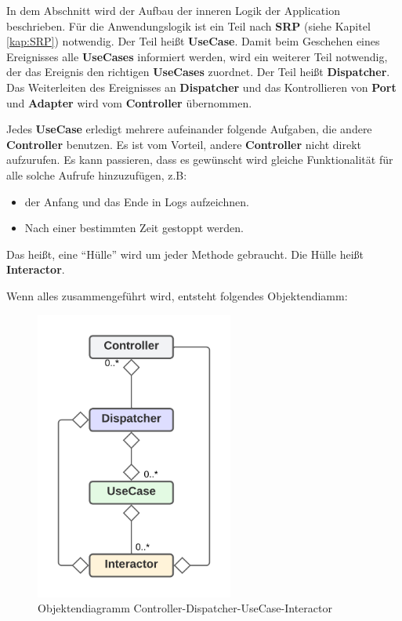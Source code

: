 In dem Abschnitt wird der Aufbau der inneren Logik der Application beschrieben. 
Für die Anwendungslogik ist ein Teil nach \textbf{SRP} (siehe Kapitel \ref{kap:SRP}) notwendig. 
Der Teil heißt \textbf{UseCase}.
Damit beim Geschehen eines Ereignisses alle \textbf{UseCases} informiert werden, 
wird ein weiterer Teil notwendig, der das Ereignis den richtigen \textbf{UseCases} zuordnet.  
Der Teil heißt \textbf{Dispatcher}.
Das Weiterleiten des Ereignisses an \textbf{Dispatcher} und das Kontrollieren von \textbf{Port} und \textbf{Adapter} wird 
vom \textbf{Controller} übernommen.

Jedes \textbf{UseCase} erledigt mehrere aufeinander folgende Aufgaben, die andere \textbf{Controller} benutzen.
Es ist vom Vorteil, andere \textbf{Controller} nicht direkt aufzurufen. 
Es kann passieren, dass es gewünscht wird gleiche Funktionalität für alle solche Aufrufe hinzuzufügen, z.B:
\begin{itemize}
    \item der Anfang und das Ende in Logs aufzeichnen.
    \item Nach einer bestimmten Zeit gestoppt werden.
\end{itemize}
Das heißt, eine ``Hülle'' wird um jeder Methode gebraucht. Die Hülle heißt \textbf{Interactor}.

Wenn alles zusammengeführt wird, entsteht folgendes Objektendiamm:

\begin{figure}[H]
    \centering
    \includegraphics[width=6.5cm]{./images/Controller-Dispatcher-UseCase-Interactor.png}
     \caption[Objektendiagramm Controller-Dispatcher-UseCase-Interactor]{Objektendiagramm Controller-Dispatcher-UseCase-Interactor}
     \label{fig:CDCDUI}
\end{figure}
